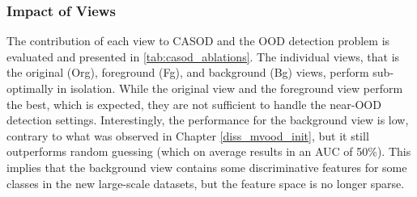 %
%
\subsubsection{Impact of Views}
\label{sec:casod_suppmat-viewcontrib}

The contribution of each view to CASOD and the OOD detection problem is evaluated and presented in \ref{tab:casod_ablations}. The individual views, that is the original (Org), foreground (Fg), and background (Bg) views, perform sub-optimally in isolation. While the original view and the foreground view perform the best, which is expected, they are not sufficient to handle the near-OOD detection settings. Interestingly, the performance for the background view is low, contrary to what was observed in Chapter \ref{diss_mvood_init}, but it still outperforms random guessing (which on average results in an AUC of 50\%). This implies that the background view contains some discriminative features for some classes in the new large-scale datasets, but the feature space is no longer sparse.

